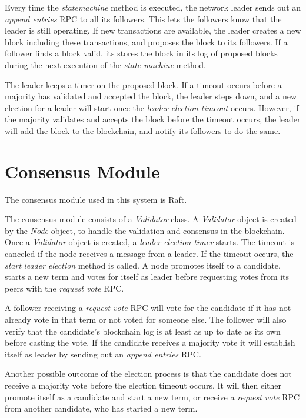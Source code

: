 Every time the \textit{state\textunderscore machine} method is executed, the network leader sends out an \textit{append entries} RPC to all its followers. This lets the followers know that the leader is still operating. If new transactions are available, the leader creates a new block including these transactions, and proposes the block to its followers. If a follower finds a block valid, its stores the block in its log of proposed blocks during the next execution of the \textit{state machine} method. 

The leader keeps a timer on the proposed block. If a timeout occurs before a majority has validated and accepted the block, the leader steps down, and a new election for a leader will start once the \textit{leader election timeout} occurs. However, if the majority validates and accepts the block before the timeout occurs, the leader will add the block to the blockchain, and notify its followers to do the same. 

\section{Consensus Module}
The consensus module used in this system is Raft. 

The consensus module consists of a \textit{Validator} class. A \textit{Validator} object is created by the \textit{Node} object, to handle the validation and consensus in the blockchain. Once a \textit{Validator} object is created, a \textit{leader election timer} starts. The timeout is canceled if the node receives a message from a leader. If the timeout occurs, the \textit{start leader election} method is called. A node promotes itself to a candidate, starts a new term and votes for itself as leader before requesting votes from its peers with the \textit{request vote} RPC. 

A follower receiving a \textit{request vote} RPC will vote for the candidate if it has not already vote in that term or not voted for someone else. The follower will also verify that the candidate's blockchain log is at least as up to date as its own before casting the vote. If the candidate receives a majority vote it will establish itself as leader by sending out an \textit{append entries} RPC. 

Another possible outcome of the election process is that the candidate does not receive a majority vote before the election timeout occurs. It will then either promote itself as a candidate and start a new term, or receive a \textit{request vote} RPC from another candidate, who has started a new term.

